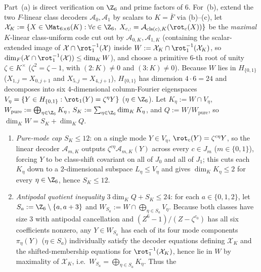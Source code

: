 \begin{outline}
Part~(a) is direct verification on $\Z_6$ and prime factors of $6$. For~(b), extend the two
$F$-linear class decoders $\mathcal{A}_0, \mathcal{A}_1$ by scalars to $K = \overline{F}$ via
(b)--(c), let $\mathcal{X}_K := \{X \in \Mat_{6\times 6}(K) :
\forall c \in \Z_6,\; X_{c,:} = \mathcal{A}_{\mathrm{cls}(c), K}(\rot_c(X))\}$ be the \emph{maximal}
$K$-linear class-uniform code cut out by $\mathcal{A}_{0,K}, \mathcal{A}_{1,K}$ (containing the
scalar-extended image of $\mathcal{X} \cap \rot_1^{-1}(\mathcal{X})$ inside
$W := \mathcal{X}_K \cap \rot_1^{-1}(\mathcal{X}_K)$, so
$\dim_F(\mathcal{X} \cap \rot_1^{-1}(\mathcal{X})) \le \dim_K W$), and choose a primitive $6$-th root
of unity $\zeta \in K^\times$ ($\zeta^2 = \zeta - 1$, with $(2 : K) \ne 0$ and $(3 : K) \ne 0$). Because
$W$ lies in $H_{\{0,1\}}$ ($X_{1,j} = X_{0,j+1}$ and
$X_{5,j} = X_{4,j+1}$), $H_{\{0,1\}}$ has dimension $4 \cdot 6 = 24$ and decomposes into six
$4$-dimensional column-Fourier eigenspaces $V_\eta = \{Y \in H_{\{0,1\}} : \rot_1(Y) = \zeta^\eta Y\}$
($\eta \in \Z_6$). Let $K_\eta := W \cap V_\eta$, $W_{\mathrm{pure}} := \bigoplus_{\eta \in \Z_6} K_\eta$,
$S_K := \sum_{\eta \in \Z_6} \dim_K K_\eta$, and $Q := W / W_{\mathrm{pure}}$, so
$\dim_K W = S_K + \dim_K Q$.
\begin{enumerate}[label=\arabic*.,leftmargin=1.5em]
\item \emph{Pure-mode cap $S_K \le 12$}: on a single mode $Y \in V_\eta$, $\rot_c(Y) = \zeta^{c\eta} Y$,
  so the linear decoder $\mathcal{A}_{m,K}$ outputs $\zeta^{c\eta}\mathcal{A}_{m,K}(Y)$ across every
  $c \in J_m$ ($m \in \{0,1\}$), forcing $Y$ to be class-shift covariant on all of $J_0$ and all of
  $J_1$; this cuts each $K_\eta$ down to a $2$-dimensional subspace $L_\eta \le V_\eta$ and gives
  $\dim_K K_\eta \le 2$ for every $\eta \in \Z_6$, hence $S_K \le 12$.
\item \emph{Antipodal quotient inequality $3\dim_K Q + S_K \le 24$}: for each $a \in \{0, 1, 2\}$, let
  $S_a := \Z_6 \setminus \{a, a + 3\}$ and $W_{S_a} := W \cap \bigoplus_{\eta \in S_a} V_\eta$. Because
  both classes have size $3$ with antipodal cancellation and $(Z^6 - 1)/(Z - \zeta^{c_0})$ has all six
  coefficients nonzero, any $Y \in W_{S_a}$ has each of its four mode components $\pi_\eta(Y)$
  ($\eta \in S_a$) individually satisfy the decoder equations defining $\mathcal{X}_K$ and the
  shifted-membership equations for $\rot_1^{-1}(\mathcal{X}_K)$, hence lie in $W$ by maximality of
  $\mathcal{X}_K$, i.e.\ $W_{S_a} = \bigoplus_{\eta \in S_a} K_\eta$. Thus the

\end{enumerate}
\end{outline}
